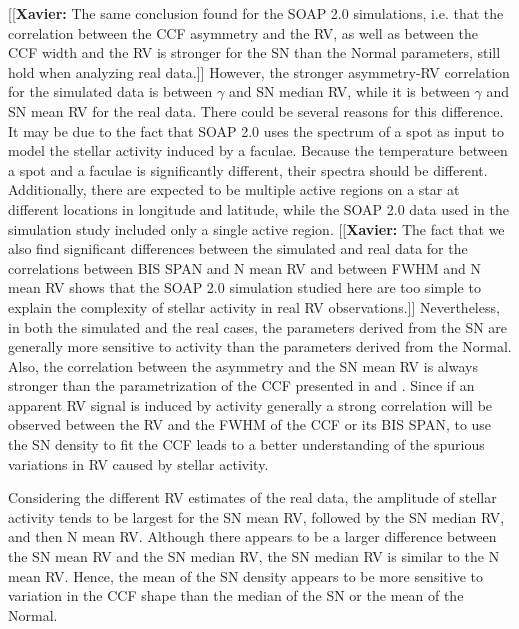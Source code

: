 \documentclass{aa}
\newcommand{\jessi}[1]{{\color{Purple}[[\textbf{Jessi: }#1]]}}
\newcommand{\xavier}[1]{{\color{blue}[[\textbf{Xavier: }#1]]}}
\begin{document}
\xavier{The same conclusion found for the SOAP 2.0 simulations, i.e. that the correlation between the CCF asymmetry and the RV, as well as between the CCF width and the RV is stronger for the SN than the Normal parameters, still hold when analyzing real data.}
However, the stronger asymmetry-RV correlation for the simulated data is between $\gamma$ and SN median RV, while it is between $\gamma$ and SN mean RV for the real data.
There could be several reasons for this difference. It may be due to the fact that SOAP 2.0 uses the spectrum of a spot as input to model the stellar activity induced by a faculae.
Because the temperature between a spot and a faculae is significantly different, their spectra should be different. 
Additionally, there are expected to be multiple active regions on a star at different locations in longitude and latitude, while the SOAP 2.0 data used in the simulation study included only a single active region. 
\xavier{The fact that we also find significant differences between the simulated and real data for the correlations between BIS SPAN and N mean RV and between FWHM and N mean RV shows that the SOAP 2.0 simulation studied here are too simple to explain the complexity of stellar activity in real RV observations.}
Nevertheless, in both the simulated and the real cases, the parameters derived from the SN are generally more sensitive to activity than the parameters derived from the Normal.  Also, the correlation between the asymmetry and the SN mean RV is always stronger than the parametrization of the CCF presented in \citet{Boisse-2011} and \citet{Figueira-2013}. Since if an apparent RV signal is induced by activity generally a strong correlation will be observed between the RV and the FWHM of the CCF or its BIS SPAN, to use the SN density to fit the CCF leads to a better understanding of the spurious variations in RV caused by stellar activity.

Considering the different RV estimates of the real data, the amplitude of stellar activity tends to be largest for the SN mean RV, followed by the SN median RV, and then N mean RV. 
Although there appears to be a larger difference between the SN mean RV and the SN median RV, the SN median RV is similar to the N mean RV. 
Hence, the mean of the SN density appears to be more sensitive to variation in the CCF shape than the median of the SN or the mean of the Normal.  %
\end{document}
